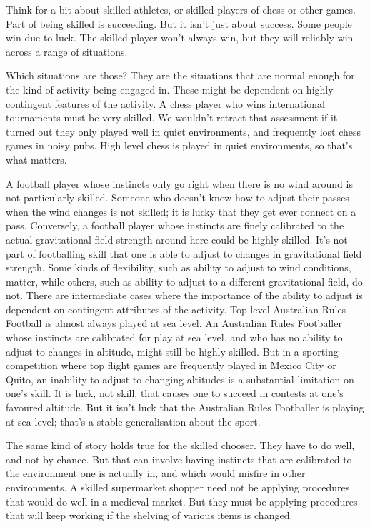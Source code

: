 \documentclass[
  11pt,
  letterpaper,
  DIV=11,
  numbers=noendperiod,
  twoside]{scrartcl}
\begin{document}
Think for a bit about skilled athletes, or skilled players of chess or
other games. Part of being skilled is succeeding. But it isn't just
about success. Some people win due to luck. The skilled player won't
always win, but they will reliably win across a range of situations.

Which situations are those? They are the situations that are normal
enough for the kind of activity being engaged in. These might be
dependent on highly contingent features of the activity. A chess player
who wins international tournaments must be very skilled. We wouldn't
retract that assessment if it turned out they only played well in quiet
environments, and frequently lost chess games in noisy pubs. High level
chess is played in quiet environments, so that's what matters.

A football player whose instincts only go right when there is no wind
around is not particularly skilled. Someone who doesn't know how to
adjust their passes when the wind changes is not skilled; it is lucky
that they get ever connect on a pass. Conversely, a football player
whose instincts are finely calibrated to the actual gravitational field
strength around here could be highly skilled. It's not part of
footballing skill that one is able to adjust to changes in gravitational
field strength. Some kinds of flexibility, such as ability to adjust to
wind conditions, matter, while others, such as ability to adjust to a
different gravitational field, do not. There are intermediate cases
where the importance of the ability to adjust is dependent on contingent
attributes of the activity. Top level Australian Rules Football is
almost always played at sea level. An Australian Rules Footballer whose
instincts are calibrated for play at sea level, and who has no ability
to adjust to changes in altitude, might still be highly skilled. But in
a sporting competition where top flight games are frequently played in
Mexico City or Quito, an inability to adjust to changing altitudes is a
substantial limitation on one's skill. It is luck, not skill, that
causes one to succeed in contests at one's favoured altitude. But it
isn't luck that the Australian Rules Footballer is playing at sea level;
that's a stable generalisation about the sport.

The same kind of story holds true for the skilled chooser. They have to
do well, and not by chance. But that can involve having instincts that
are calibrated to the environment one is actually in, and which would
misfire in other environments. A skilled supermarket shopper need not be
applying procedures that would do well in a medieval market. But they
must be applying procedures that will keep working if the shelving of
various items is changed.
\end{document}
